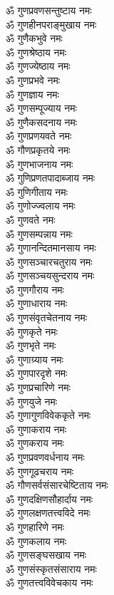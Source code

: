 \begin{multicols}{2}
\begin{flushleft}
ॐ गुणप्रवणसन्तुष्टाय नमः\\
ॐ गुणहीनपराङ्मुखाय नमः\\
ॐ गुणैकभुवे नमः\\
ॐ गुणश्रेष्ठाय नमः\\
ॐ गुणज्येष्ठाय नमः\hfill{}\\
ॐ गुणप्रभवे नमः\\
ॐ गुणज्ञाय नमः\\
ॐ गुणसम्पूज्याय नमः\\
ॐ गुणैकसदनाय नमः\\
ॐ गुणप्रणयवते नमः\\
ॐ गौणप्रकृतये नमः\\
ॐ गुणभाजनाय नमः\\
ॐ गुणिप्रणतपादाब्जाय नमः\\
ॐ गुणिगीताय नमः\\
ॐ गुणोज्ज्वलाय नमः\hfill{}\\
ॐ गुणवते नमः\\
ॐ गुणसम्पन्नाय नमः\\
ॐ गुणानन्दितमानसाय नमः\\
ॐ गुणसञ्चारचतुराय नमः\\
ॐ गुणसञ्चयसुन्दराय नमः\\
ॐ गुणगौराय नमः\\
ॐ गुणाधाराय नमः\\
ॐ गुणसंवृतचेतनाय नमः\\
ॐ गुणकृते नमः\\
ॐ गुणभृते नमः\hfill{}\\
ॐ गुणाग्र्याय नमः\\
ॐ गुणपारदृशे नमः\\
ॐ गुणप्रचारिणे नमः\\
ॐ गुणयुजे नमः\\
ॐ गुणागुणविवेककृते नमः\\
ॐ गुणाकराय नमः\\
ॐ गुणकराय नमः\\
ॐ गुणप्रवणवर्धनाय नमः\\
ॐ गुणगूढचराय नमः\\
ॐ गौणसर्वसंसारचेष्टिताय नमः\hfill{}\\
ॐ गुणदक्षिणसौहार्दाय नमः\\
ॐ गुणलक्षणतत्त्वविदे नमः\\
ॐ गुणहारिणे नमः\\
ॐ गुणकलाय नमः\\
ॐ गुणसङ्घसखाय नमः\\
ॐ गुणसंस्कृतसंसाराय नमः\\
ॐ गुणतत्त्वविवेचकाय नमः\\

\end{flushleft}
\end{multicols}
